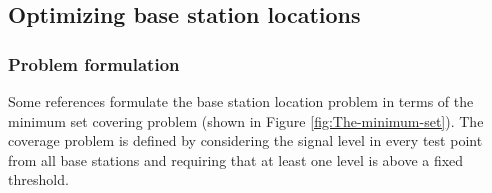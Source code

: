 \subsection{Optimizing base station locations}


\subsubsection{Problem formulation}

Some references \cite{minimum.set.covering.problem:1997,minimum.set.covering.problem:1998,minimum.set.covering.problem:2000}
formulate the base station location problem in terms of the minimum
set covering problem (shown in Figure \ref{fig:The-minimum-set}).
The coverage problem is defined by considering the signal level in
every test point from all base stations and requiring that at least
one level is above a fixed threshold.

